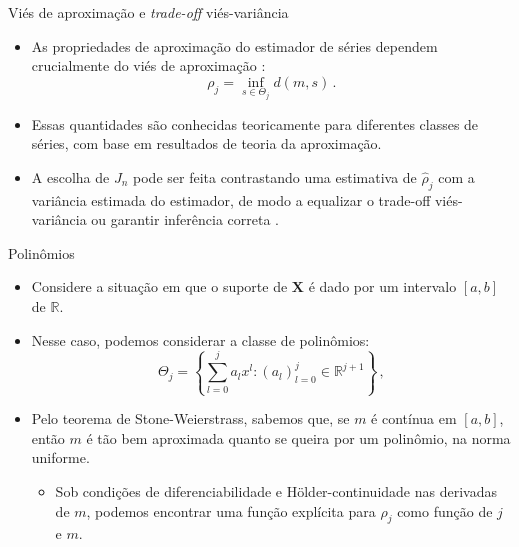 \documentclass[11pt]{beamer}
\begin{document}
	\begin{frame}{Viés de aproximação e \textit{trade-off} viés-variância}
	\begin{itemize}
		\item As propriedades de aproximação do estimador de séries dependem crucialmente do {\color{blue}viés de aproximação }:
		$$\rho_j = \inf_{s \in \Theta_j} d(m, s) \, .$$
		\item Essas quantidades são conhecidas teoricamente para diferentes classes de séries, com base em resultados de teoria da aproximação.
		\item A escolha de $J_n$ pode ser feita contrastando uma estimativa de $\hat{\rho}_j$ com a variância estimada do estimador, de modo a equalizar o trade-off viés-variância ou garantir inferência correta \citep{belloni2015some,Chen2024}.
	\end{itemize}
	\end{frame}
	
	\begin{frame}{Polinômios}
	\begin{itemize}
		\item Considere a situação em que o suporte de $\boldsymbol{X}$ é dado por um intervalo $[a,b]$ de $\mathbb{R}$.
		\item Nesse caso, podemos considerar a classe de polinômios:
		$$\Theta_j = \left\{ \sum_{l=0}^j a_l x^l: (a_l)_{l=0}^j \in \mathbb{R}^{j+1}\right\}\, ,$$
		\item Pelo teorema de Stone-Weierstrass, sabemos que, se $m$ é contínua em $[a,b]$, então $m$ é tão bem aproximada quanto se queira por um polinômio, na norma uniforme.
		\begin{itemize}
			\item Sob condições de diferenciabilidade e H\"{o}lder-continuidade nas derivadas de $m$, podemos encontrar uma função explícita para $\rho_j$ como função de $j$ e $m$.
		\end{itemize}
	\end{itemize}
	\end{frame}
	
\end{document}
